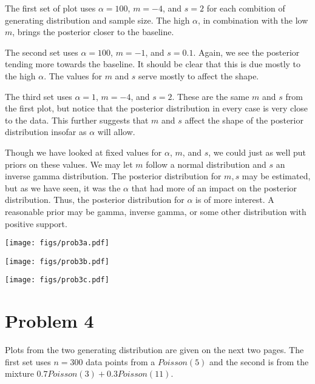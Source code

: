 \documentclass[12pt]{article}
\begin{document}
\noindent The first set of plot uses $\alpha=100$, $m=-4$, and $s=2$ for each combition of generating distribution and sample size. The high $\alpha$, in combination with the low $m$, brings the posterior closer to the baseline.
\bigskip

\noindent The second set uses $\alpha=100$, $m=-1$, and $s=0.1$. Again, we see the posterior tending more towards the baseline. It should be clear that this is due mostly to the high $\alpha$. The values for $m$ and $s$ serve mostly to affect the shape.
\bigskip

\noindent The third set uses $\alpha=1$, $m=-4$, and $s=2$. These are the same $m$ and $s$ from the first plot, but notice that the posterior distribution in every case is very close to the data. This further suggests that $m$ and $s$ affect the shape of the posterior distribution insofar as $\alpha$ will allow. 
\bigskip

\noindent Though we have looked at fixed values for $\alpha$, $m$, and $s$, we could just as well put priors on these values. We may let $m$ follow a normal distribution and $s$ an inverse gamma distribution. The posterior distribution for $m, s$ may be estimated, but as we have seen, it was the $\alpha$ that had more of an impact on the posterior distribution. Thus, the posterior distribution for $\alpha$ is of more interest. A reasonable prior may be gamma, inverse gamma, or some other distribution with positive support.

\newpage

\begin{center}
\texttt{[image: figs/prob3a.pdf]}
\end{center}

\newpage

\begin{center}
\texttt{[image: figs/prob3b.pdf]}
\end{center}

\newpage

\begin{center}
\texttt{[image: figs/prob3c.pdf]}
\end{center}

\newpage

\section*{Problem 4}

\noindent Plots from the two generating distribution are given on the next two pages. The first set uses $n=300$ data points from a $Poisson(5)$ and the second is from the mixture $0.7Poisson(3) + 0.3Poisson(11)$.
\bigskip
\end{document}
